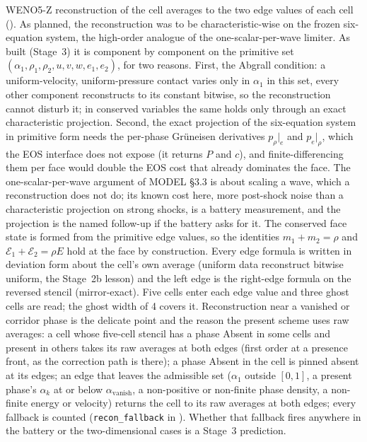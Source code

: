\documentclass[11pt,a4paper]{article}
\newcommand{\code}[1]{\texttt{\small #1}}
\begin{document}
WENO5-Z reconstruction of the cell averages to the two edge values of
each cell ().  As planned, the reconstruction was to be
characteristic-wise on the frozen six-equation system, the high-order
analogue of the one-scalar-per-wave limiter.  As built (Stage~3) it is
component by component on the primitive set $(\alpha_1, \rho_1, \rho_2,
u, v, w, e_1, e_2)$, for two reasons.  First, the Abgrall condition: a
uniform-velocity, uniform-pressure contact varies only in $\alpha_1$ in
this set, every other component reconstructs to its constant bitwise, so
the reconstruction cannot disturb it; in conserved variables the same
holds only through an exact characteristic projection.  Second, the exact
projection of the six-equation system in primitive form needs the
per-phase Gr\"uneisen derivatives $p_\rho|_e$ and $p_e|_\rho$, which
the EOS interface does not expose (it returns $P$ and $c$), and
finite-differencing them per face would double the EOS cost that already
dominates the face.  The one-scalar-per-wave argument of MODEL \S3.3 is
about scaling a wave, which a reconstruction does not do; its known cost
here, more post-shock noise than a characteristic projection on strong
shocks, is a battery measurement, and the projection is the named
follow-up if the battery asks for it.  The conserved face state is formed
from the primitive edge values, so the identities $m_1+m_2=\rho$ and
$\mathcal{E}_1+\mathcal{E}_2=\rho E$ hold at the face by construction.
Every edge formula is written in deviation form about the cell's own
average (uniform data reconstruct bitwise uniform, the Stage~2b lesson)
and the left edge is the right-edge formula on the reversed stencil
(mirror-exact).  Five cells enter each edge value and three ghost cells
are read; the ghost width of 4 covers it.  Reconstruction near a vanished or corridor phase is
the delicate point and the reason the present scheme uses raw averages:
a cell whose five-cell stencil has a phase Absent in some cells and
present in others takes its raw averages at both edges (first order at a
presence front, as the correction path is there); a phase Absent in the
cell is pinned absent at its edges; an edge that leaves the admissible
set ($\alpha_1$ outside $[0,1]$, a present phase's $\alpha_k$ at or below
$\alpha_{\mathrm{vanish}}$, a non-positive or non-finite phase density, a
non-finite energy or velocity) returns the cell to its raw averages at
both edges; every fallback is counted (\code{recon\_fallback} in
).  Whether that fallback fires anywhere in the
battery or the two-dimensional cases is a Stage~3 prediction.
\end{document}
